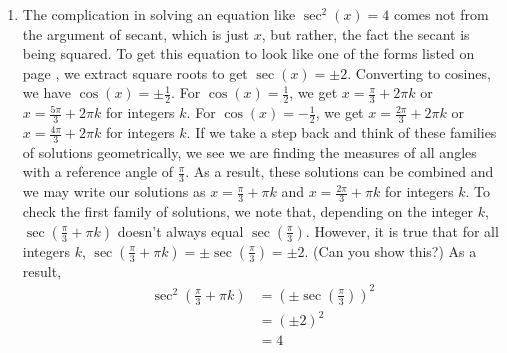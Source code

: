 {\begin{enumerate}


\item The complication in solving an equation like $\sec^{2}(x) = 4$ comes not from the argument of secant, which is just $x$, but rather, the fact the secant is being squared.  To get this equation to look like one of the forms listed on page \pageref{trigeqnstrategy1}, we extract square roots to get $\sec(x) = \pm 2$. Converting to cosines, we have  $\cos(x) = \pm \frac{1}{2}$.  For $\cos(x) = \frac{1}{2}$, we get $x = \frac{\pi}{3} + 2\pi k$ or $x = \frac{5\pi}{3} + 2\pi k$ for integers $k$.  For $\cos(x) = -\frac{1}{2}$, we get $x = \frac{2\pi}{3} + 2\pi k$ or $x = \frac{4\pi}{3} + 2\pi k$ for integers $k$.  If we take a step back and think of these families of solutions geometrically, we see we are finding the measures of all angles with a reference angle of $\frac{\pi}{3}$.  As a result, these solutions can be combined and we may write our solutions as $x = \frac{\pi}{3} + \pi k$ and $x = \frac{2\pi}{3} + \pi k$ for integers $k$.  To check the first family of solutions, we note that, depending on the integer $k$,  $\sec\left(\frac{\pi}{3} + \pi k\right)$ doesn't always equal $\sec\left(\frac{\pi}{3}\right)$.  However, it is true that for all integers $k$,  $\sec\left(\frac{\pi}{3} + \pi k\right) = \pm \sec\left(\frac{\pi}{3}\right) = \pm 2$.  (Can you show this?)  As a result, 
\begin{align*}
\sec^{2}\left(\frac{\pi}{3} + \pi k\right)  &  =   \left( \pm \sec\left(\frac{\pi}{3}\right)\right)^2 \\ 
				& =  (\pm 2)^2   \\														& =  4 
\end{align*}
\drawexampleline


\end{enumerate}}
